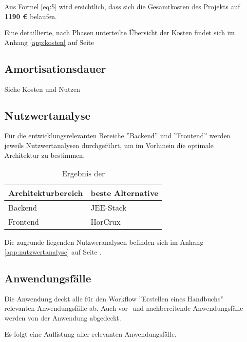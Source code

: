 \documentclass[12pt, xcolor=dvipsnames]{scrartcl}
\begin{document}
Aus Formel \ref{eq:5} wird ersichtlich, dass sich die Gesamtkosten des Projekts auf \textbf{1190 \euro{}} belaufen.

Eine detaillierte, nach Phasen unterteilte Übersicht der Kosten findet sich im Anhang \ref{app:kosten} auf Seite \pageref{app:kosten}

\subsection{Amortisationsdauer}

Siehe Kosten und Nutzen

\subsection{Nutzwertanalyse}

Für die entwicklungsrelevanten Bereiche ''Backend'' und ''Frontend'' werden jeweils Nutzwertanalysen durchgeführt, um im Vorhinein die optimale Architektur zu bestimmen.

\begin{table}[H]
	\centering
	\begin{tabular}{ll}

		\rowcolor{white!15}				
		\textbf{Architekturbereich} & \textbf{beste Alternative} \\\hline		
				
		Backend & JEE-Stack \\
		Frontend & HorCrux	\\	
			    
	\end{tabular}
	\caption{Ergebnis der }
	\label{tab:nutzwertanalyse}
\end{table}

Die zugrunde liegenden Nutzweranalysen befinden sich im Anhang \ref{app:nutzwertanalyse} auf Seite \pageref{app:nutzwertanalyse}.

\subsection{Anwendungsfälle}

Die Anwendung deckt alle für den Workflow ''Erstellen eines Handbuchs'' relevanten Anwendungsfälle ab. Auch vor- und nachbereitende Anwendungsfälle werden von der Anwendung abgedeckt.

Es folgt eine Auflistung aller relevanten Anwendungsfälle.
\end{document}
